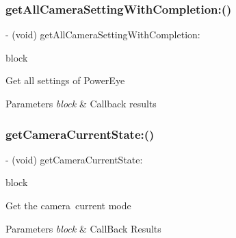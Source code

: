 \subsubsection{\texorpdfstring{get\+All\+Camera\+Setting\+With\+Completion\+:()}{getAllCameraSettingWithCompletion:()}}
{\footnotesize\ttfamily -\/ (void) get\+All\+Camera\+Setting\+With\+Completion\+: \begin{DoxyParamCaption}\item[{(P\+V\+Completion\+Block)}]{block }\end{DoxyParamCaption}}

Get all settings of Power\+Eye


\begin{DoxyParams}{Parameters}
{\em block} & Callback results \\
\hline
\end{DoxyParams}
\mbox{\label{interface_p_v_camera_a6a7279d4abe72a35eb712c59d2c786ef}} 
\subsubsection{\texorpdfstring{get\+Camera\+Current\+State\+:()}{getCameraCurrentState:()}}
{\footnotesize\ttfamily -\/ (void) get\+Camera\+Current\+State\+: \begin{DoxyParamCaption}\item[{(void($^\wedge$)(P\+V\+Camera\+State camerastate, N\+S\+Error $\ast$\hyperlink{group___p_v_s_d_k___c_o_r_e___a_p_i___m_o_u_n_t_c_o_n_t_r_o_l_ga5a1de33b230662127568783314b4a54d}{\+\_\+\+Nullable} error))}]{block }\end{DoxyParamCaption}}

Get the camera current mode


\begin{DoxyParams}{Parameters}
{\em block} & Call\+Back Results \\
\hline
\end{DoxyParams}
\mbox{\label{interface_p_v_camera_ac25342f6acc76602836f7e3326a3d1d3}} 
